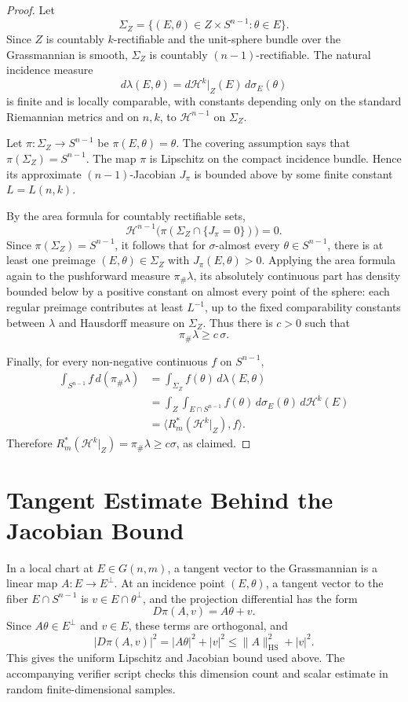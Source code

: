 \documentclass[11pt]{article}
\newcommand{\HH}{\mathcal H}
\begin{document}
\begin{proof}
Let
\[
  \Sigma_Z=\{(E,\theta)\in Z\times S^{n-1}:\theta\in E\}.
\]
Since \(Z\) is countably \(k\)-rectifiable and the unit-sphere bundle over the
Grassmannian is smooth, \(\Sigma_Z\) is countably \((n-1)\)-rectifiable. The
natural incidence measure
\[
  d\lambda(E,\theta)=d\HH^k|_Z(E)\,d\sigma_E(\theta)
\]
is finite and is locally comparable, with constants depending only on the
standard Riemannian metrics and on \(n,k\), to \(\HH^{n-1}\) on
\(\Sigma_Z\).

Let \(\pi:\Sigma_Z\to S^{n-1}\) be \(\pi(E,\theta)=\theta\). The covering
assumption says that \(\pi(\Sigma_Z)=S^{n-1}\). The map \(\pi\) is Lipschitz
on the compact incidence bundle. Hence its approximate \((n-1)\)-Jacobian
\(J_\pi\) is bounded above by some finite constant \(L=L(n,k)\).

By the area formula for countably rectifiable sets,
\[
  \HH^{n-1}\bigl(\pi(\Sigma_Z\cap\{J_\pi=0\})\bigr)=0.
\]
Since \(\pi(\Sigma_Z)=S^{n-1}\), it follows that for \(\sigma\)-almost every
\(\theta\in S^{n-1}\), there is at least one preimage
\((E,\theta)\in\Sigma_Z\) with \(J_\pi(E,\theta)>0\). Applying the area formula
again to the pushforward measure \(\pi_\#\lambda\), its absolutely continuous
part has density bounded below by a positive constant on almost every point of
the sphere: each regular preimage contributes at least \(L^{-1}\), up to the
fixed comparability constants between \(\lambda\) and Hausdorff measure on
\(\Sigma_Z\). Thus there is \(c>0\) such that
\[
  \pi_\#\lambda\geq c\,\sigma .
\]

Finally, for every non-negative continuous \(f\) on \(S^{n-1}\),
\[
\begin{aligned}
  \int_{S^{n-1}} f\,d(\pi_\#\lambda)
  &=
  \int_{\Sigma_Z} f(\theta)\,d\lambda(E,\theta)  \\
  &=
  \int_Z\int_{E\cap S^{n-1}} f(\theta)\,d\sigma_E(\theta)\,d\HH^k(E) \\
  &=
  \langle R_m^*(\HH^k|_Z),f\rangle .
\end{aligned}
\]
Therefore \(R_m^*(\HH^k|_Z)=\pi_\#\lambda\geq c\sigma\), as claimed.
\end{proof}

\section*{Tangent Estimate Behind the Jacobian Bound}

In a local chart at \(E\in G(n,m)\), a tangent vector to the Grassmannian is a
linear map \(A:E\to E^\perp\). At an incidence point \((E,\theta)\), a tangent
vector to the fiber \(E\cap S^{n-1}\) is \(v\in E\cap\theta^\perp\), and the
projection differential has the form
\[
  D\pi(A,v)=A\theta+v.
\]
Since \(A\theta\in E^\perp\) and \(v\in E\), these terms are orthogonal, and
\[
  |D\pi(A,v)|^2=|A\theta|^2+|v|^2
  \leq \|A\|_{\mathrm{HS}}^2+|v|^2.
\]
This gives the uniform Lipschitz and Jacobian bound used above. The
accompanying verifier script checks this dimension count and scalar estimate
in random finite-dimensional samples.
\end{document}
